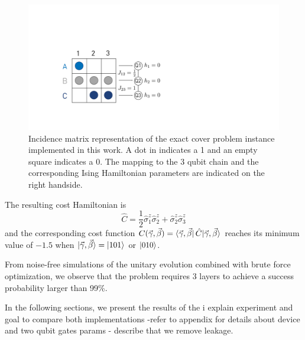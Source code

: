 \begin{figure}[ht]
    \centering
    \includegraphics[width=\textwidth, trim={11cm 8cm 38cm 10cm},clip]{chapters/qaoa/figs/exact_cover_matrix.pdf}
    \caption{Incidence matrix representation of the exact cover problem instance implemented in this work. A dot in indicates a 1 and an empty square indicates a 0. The mapping to the 3 qubit chain and the corresponding Ising Hamiltonian parameters are indicated on the right handside.}
    \label{fig:qaoa_exact_cover_matrix}
\end{figure}

The resulting cost Hamiltonian is
\begin{equation}
    \hat C = \frac{1}{2}\hat\sigma_1^z\hat\sigma_2^z + \hat\sigma_2^z\hat\sigma_3^z
\end{equation}
and the corresponding cost function $C(\vec\gamma, \vec\beta) = \bra{\vec\gamma, \vec\beta} \hat C |\vec{\gamma}, \vec{\beta}\rangle{}$ reaches its minimum value of $-1.5$ when $|\vec{\gamma}, \vec{\beta}\rangle{} = \ket{101}$ or $\ket{010}$. 

From noise-free simulations of the unitary evolution combined with brute force optimization, we observe that the problem requires 3 layers to achieve a success probability larger than 99\%.

In the following sections, we present the results of the i
explain experiment and goal to compare both implementations
-refer to appendix for details about device and two qubit gates params
- describe that we remove leakage.


